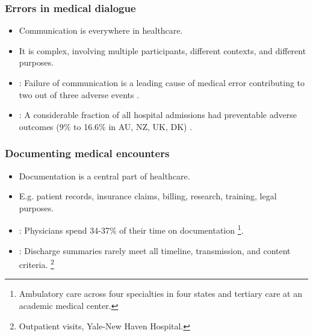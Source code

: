 \begin{frame}
    \frametitle{Errors in medical dialogue}
    \begin{itemize}
        \item<1,2>Communication is everywhere in healthcare. 
        \item <1,2>It is complex, involving multiple participants, different contexts, and different purposes.
        \vspace{1em}
        \item <2> : Failure of communication is a leading cause of medical error contributing to two out of three adverse events \cite{starmer_changes_2014}.
        \item <2> : A considerable fraction of all hospital admissions had preventable adverse outcomes (9\% to 16.6\% in AU, NZ, UK, DK) \cite{carver_medical_2024}.
    \end{itemize}
\end{frame}





\begin{frame}
    \frametitle{Documenting medical encounters}
    \begin{itemize}
        \item <1,2> Documentation is a central part of healthcare.
        \item <1,2> E.g. patient records, insurance claims, billing, research, training, legal purposes.
        \vspace{1em}
        \item <2> : Physicians spend 34-37\% of their time on documentation \cite{joukes_time_2018, tipping_where_2010, sinsky_allocation_2016}\footnote{Ambulatory care across four specialties in four states and tertiary care at an academic medical center.}.
        \item <2> : Discharge summaries rarely meet all timeline, transmission, and content criteria. \cite{horwitz_comprehensive_2013}\footnote{Outpatient visits, Yale-New Haven Hospital.}
    \end{itemize}
    
\end{frame}


